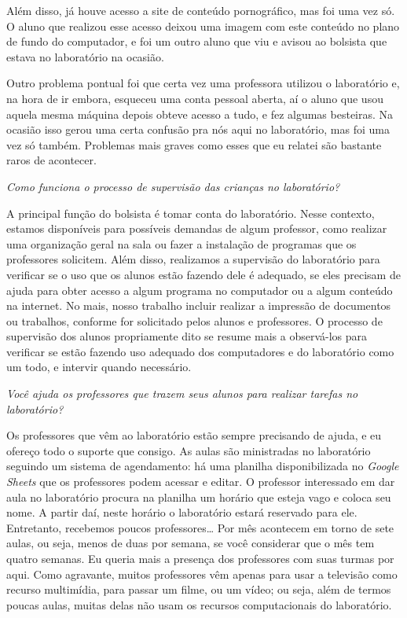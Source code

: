 Além disso, já houve acesso a site de conteúdo pornográfico, mas foi uma vez só. O aluno que realizou esse acesso deixou uma imagem com este conteúdo no plano de fundo do computador, e foi um outro aluno que viu e avisou ao bolsista que estava no laboratório na ocasião.

Outro problema pontual foi que certa vez uma professora utilizou o laboratório e, na hora de ir embora, esqueceu uma conta pessoal aberta, aí o aluno que usou aquela mesma máquina depois obteve acesso a tudo, e fez algumas besteiras. Na ocasião isso gerou uma certa confusão pra nós aqui no laboratório, mas foi uma vez só também. Problemas mais graves como esses que eu relatei são bastante raros de acontecer.

\textit{Como funciona o processo de supervisão das crianças no laboratório?}

A principal função do bolsista é tomar conta do laboratório. Nesse contexto, estamos disponíveis para possíveis demandas de algum professor, como realizar uma organização geral na sala ou fazer a instalação de programas que os professores solicitem. Além disso, realizamos a supervisão do laboratório para verificar se o uso que os alunos estão fazendo dele é adequado, se eles precisam de ajuda para obter acesso a algum programa no computador ou a algum conteúdo na internet. No mais, nosso trabalho incluir realizar a impressão de documentos ou trabalhos, conforme for solicitado pelos alunos e professores. O processo de supervisão dos alunos propriamente dito se resume mais a observá-los para verificar se estão fazendo uso adequado dos computadores e do laboratório como um todo, e intervir quando necessário.

\textit{Você ajuda os professores que trazem seus alunos para realizar tarefas no laboratório?}

Os professores que vêm ao laboratório estão sempre precisando de ajuda, e eu ofereço todo o suporte que consigo. As aulas são ministradas no laboratório seguindo um sistema de agendamento: há uma planilha disponibilizada no \textit{Google Sheets} que os professores podem acessar e editar. O professor interessado em dar aula no laboratório procura na planilha um horário que esteja vago e coloca seu nome. A partir daí, neste horário o laboratório estará reservado para ele. Entretanto, recebemos poucos professores… Por mês acontecem em torno de sete aulas, ou seja, menos de duas por semana, se você considerar que o mês tem quatro semanas. Eu queria mais a presença dos professores com suas turmas por aqui. Como agravante, muitos professores vêm apenas para usar a televisão como recurso multimídia, para passar um filme, ou um vídeo; ou seja, além de termos poucas aulas, muitas delas não usam os recursos computacionais do laboratório.

